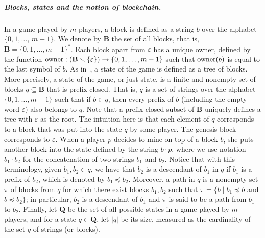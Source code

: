 \documentclass[a4paper,english,cleveref, autoref,numberwithinsect]{lipics-v2019}
\newcommand{\owner}{\text{\rm owner}}
\newcommand{\bB}{\mathbf{B}}
\newcommand{\bQ}{\mathbf{Q}}
\begin{document}
\subparagraph*{Blocks, states and the notion of blockchain.}%
In a game played by $m$ players, a block is defined as a string $b$ over the alphabet $\{0,1,\ldots$, $m-1\}$. We denote by $\bB$ the set of all blocks, that is, $\bB = \{0,1,\ldots , m-1\}^*$. Each block apart from $\varepsilon$ has a unique owner, defined by the function $\owner: (\bB \smallsetminus \{\varepsilon\}) \rightarrow \{0,1, \ldots ,m-1\}$ such that $\owner(b)$ is equal to the last symbol of $b$. As in~\cite{mininggames:2016}, a state of the game is defined as a tree of blocks. More precisely, a state of the game, or just state, is a finite and nonempty set of blocks $q \subseteq \bB$ that is prefix closed. That is, $q$ is a set of strings over the alphabet $\{0,1,\ldots, m-1\}$ such that if $b\in q$, then every prefix of $b$ (including the empty word $\varepsilon$) also belongs to $q$. Note that a prefix closed subset of $\bB$ uniquely defines a tree with $\varepsilon$ as the root.
%
The intuition here is that each element of $q$ corresponds to a block that was put into the state $q$ by some player. The genesis block corresponds to $\varepsilon$. When a player $p$ decides to mine on top of a block $b$, she puts another block into the state defined by the string $b\cdot p$, where we use notation $b_1 \cdot b_2$ for the concatenation of two strings $b_1$ and $b_2$.
%
Notice that with this terminology, given $b_1, b_2 \in q$, we have that $b_2$ is a descendant of $b_1$ in $q$ if $b_1$ is a prefix of $b_2$, which is denoted by $b_1 \preceq b_2$. Moreover, a path in $q$ is a nonempty set $\pi$ of blocks from $q$ for which there exist blocks $b_1, b_2$ such that $\pi = \{ b \mid b_1 \preceq b$ and $b \preceq b_2\}$; in particular, $b_2$ is a descendant of $b_1$ and $\pi$ is said to be a path from $b_1$ to $b_2$.
Finally, let $\bQ$ be the set of all possible states in a game played by $m$ players, and for a state $q \in \bQ$, let $|q|$ be its size, measured as the cardinality of the set $q$ of strings (or blocks).
\end{document}
